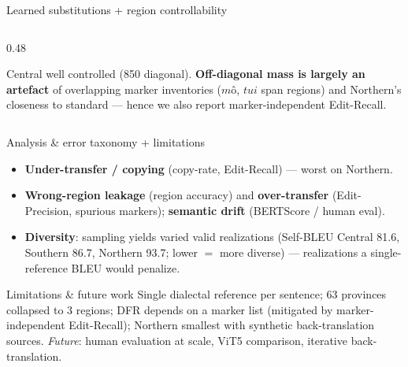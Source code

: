 \documentclass[aspectratio=169,11pt]{beamer}
\newcommand{\hl}[1]{\textcolor{oiblue}{\textbf{#1}}}
\begin{document}
\begin{frame}{Learned substitutions + region controllability}
\begin{columns}[T]
\begin{column}{0.48\textwidth}
      \par\vspace{0.3em}
      {\scriptsize Central well controlled (850 diagonal). \hl{Off-diagonal mass is largely an artefact} of overlapping marker inventories ($mô$, $tui$ span regions) and Northern's closeness to standard --- hence we also report marker-independent Edit-Recall.}
    \end{column}
  \end{columns}
\end{frame}

\begin{frame}{Analysis \& error taxonomy + limitations}
  \begin{itemize}\small
    \item \hl{Under-transfer / copying} (copy-rate, Edit-Recall) --- worst on Northern.
    \item \hl{Wrong-region leakage} (region accuracy) and \hl{over-transfer} (Edit-Precision, spurious markers); \hl{semantic drift} (BERTScore / human eval).
    \item \hl{Diversity}: sampling yields varied valid realizations (Self-BLEU Central 81.6, Southern 86.7, Northern 93.7; lower $=$ more diverse) --- realizations a single-reference BLEU would penalize.
  \end{itemize}
  \vspace{0.2em}
  \begin{block}{Limitations \& future work}\small
    Single dialectal reference per sentence; 63 provinces collapsed to 3 regions; DFR depends on a marker list (mitigated by marker-independent Edit-Recall); Northern smallest with synthetic back-translation sources. \emph{Future}: human evaluation at scale, ViT5 comparison, iterative back-translation.
  \end{block}
\end{frame}
\end{document}
